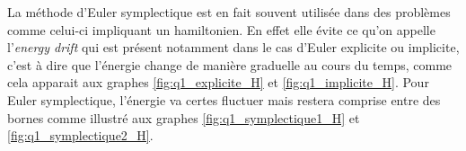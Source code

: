   La méthode d'Euler symplectique est en fait souvent utilisée dans des problèmes comme celui-ci impliquant un hamiltonien. En effet elle évite ce qu'on appelle l'\textit{energy drift} qui est présent notamment dans le cas d'Euler explicite ou implicite, c'est à dire que l'énergie change de manière graduelle au cours du temps, comme cela apparait aux graphes \ref{fig:q1_explicite_H} et \ref{fig:q1_implicite_H}. Pour Euler symplectique, l'énergie va certes fluctuer mais restera comprise entre des bornes comme illustré aux graphes \ref{fig:q1_symplectique1_H} et \ref{fig:q1_symplectique2_H}.
